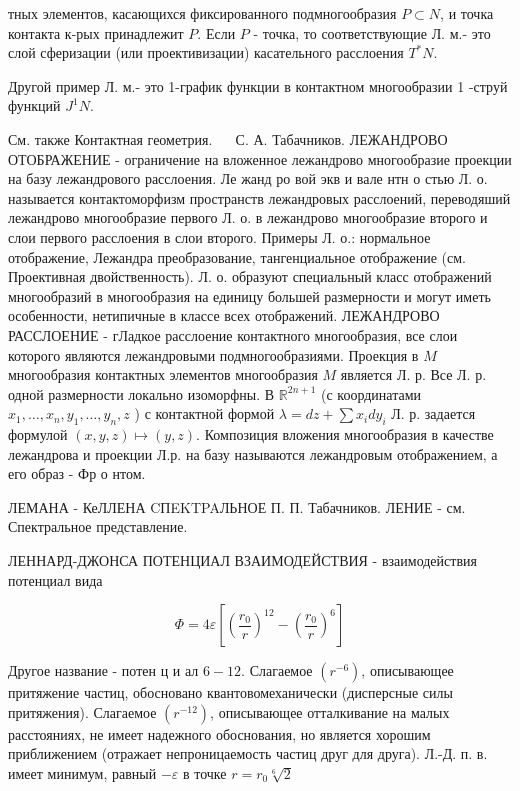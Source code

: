 \documentclass[10pt]{article}
\begin{document}
тных элементов, касающихся фиксированного подмногообразия $P \subset N$, и точка контакта к-рых принадлежит $P$. Если $P$ - точка, то соответствующие Л. м.- это слой сферизации (или проективизации) касательного расслоения $T^{*} N$.



Другой пример Л. м.- это 1-график функции в контактном многообразии 1 -струй функций $J^{1} N$.



См. также Контактная геометрия. $\quad$ С. А. Табачников. ЛЕЖАНДРОВО ОТОБРАЖЕНИЕ - ограничение на вложенное лежандрово многообразие проекции на базу лежандрового расслоения. Ле жанд ро вой экв и вале нтн о стью Л. о. называется контактоморфизм пространств лежандровых расслоений, переводяший лежандрово многообразие первого Л. о. в лежандрово многообразие второго и слои первого расслоения в слои второго. Примеры Л. о.: нормальное отображение, Лежандра преобразование, тангенциальное отображение (см. Проективная двойственность). Л. о. образуют специальный класс отображений многообразий в многообразия на единицу большей размерности и могут иметь особенности, нетипичные в классе всех отображений. ЛЕЖАНДРОВО РАССЛОЕНИЕ - гЛадкое расслоение контактного многообразия, все слои которого являются лежандровыми подмногообразиями. Проекция в $M$ многообразия контактных элементов многообразия $M$ является Л. р. Все Л. р. одной размерности локально изоморфны. В $\mathbb{R}^{2 n+1}$ (с координатами $x_{1}, \ldots, x_{n}, y_{1}, \ldots, y_{n}, z$ ) с контактной формой $\lambda=d z+\sum x_{i} d y_{i}$ Л. р. задается формулой $(x, y, z) \mapsto(y, z)$. Композиция вложения многообразия в качестве лежандрова и проекции Л.р. на базу называются лежандровым отображением, а его образ - Фр о нтом.



ЛЕМАНА - КеЛЛЕНА CПEKTPAЛЬНОЕ П. П. Табачников. ЛЕНИЕ - см. Спектральное представление.



ЛЕННАРД-ДЖОНСА ПОТЕНЦИАЛ ВЗАИМОДЕЙСТВИЯ - взаимодействия потенциал вида



\[

\Phi=4 \varepsilon\left[\left(\frac{r_{0}}{r}\right)^{12}-\left(\frac{r_{0}}{r}\right)^{6}\right]

\]



Другое название - потен ц и ал $6-12$. Слагаемое $\left(r^{-6}\right)$, описывающее притяжение частиц, обосновано квантовомеханически (дисперсные силы притяжения). Слагаемое $\left(r^{-12}\right)$, описывающее отталкивание на малых расстояниях, не имеет надежного обоснования, но является хорошим приближением (отражает непроницаемость частиц друг для друга). Л.-Д. п. в. имеет минимум, равный $-\varepsilon$ в точке $r=r_{0} \sqrt[6]{2}$
\end{document}
